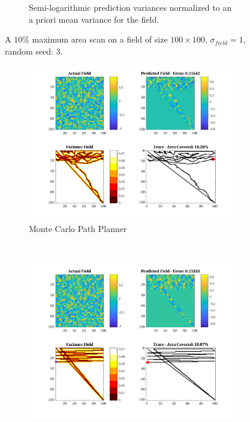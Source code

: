 \begin{figure}[htb!]
\begin{subfigure}[t]{0.65\textwidth}
        \captionsetup{skip=0.20\baselineskip,size=footnotesize}
        \caption{Semi-logarithmic prediction variances normalized to an a priori mean variance for the field.}
        \label{fig:prederrs_sigma1_p10_s3}
    \end{subfigure}
    \captionsetup{skip=0.20\baselineskip}
    \caption{A $10\%$ maximum area scan on a field of size $100 \times 100$, $\sigma_{field} = 1$, random seed: 3.}
    \label{fig:sigma1_p10_s3}
\end{figure}

\begin{figure}[htb!]
    \centering
    \begin{subfigure}[t]{0.5\textwidth}
        \centering
        \includegraphics[width=\linewidth]{figures/hbresults/mc_10p_100x100_sf_1_seed_3.png}
        \captionsetup{skip=0.10\baselineskip,size=footnotesize}
        \caption{Monte Carlo Path Planner}
    \end{subfigure}%
    ~ 
    \begin{subfigure}[t]{0.5\textwidth}
        \centering
        \includegraphics[width=\linewidth]{figures/hbresults/nhv_10p_100x100_sf_1_seed_3.png}

\end{subfigure}
\end{figure}
